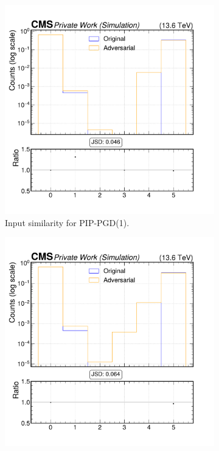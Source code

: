 \begin{figure}[htbp]
  \centering
  \begin{subfigure}[t]{0.32\textwidth}
    \includegraphics[width=\linewidth]{media/output/features/compare/combined_it_1/cmp_cpf_arr_Cpfcan_quality.pdf}
    \caption*{Input similarity for PIP-PGD(1).}
  \end{subfigure}\hfill
  \begin{subfigure}[t]{0.32\textwidth}
    \includegraphics[width=\linewidth]{media/output/features/compare/combined_it_2/cmp_cpf_arr_Cpfcan_quality.pdf}

\end{subfigure}
\end{figure}
